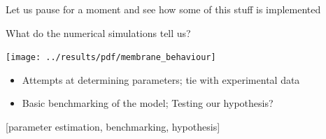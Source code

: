 \documentclass[ignorenonframetext]{beamer}
\newcommand{\references}[1] {
  \begin{flushright}
    \scriptsize [#1] \normalsize
  \end{flushright}
}
\begin{document}
\begin{frame}{Let us pause for a moment and see how some of this stuff is implemented}




\end{frame}

%

\begin{frame}{What do the numerical simulations tell us?}

  \texttt{[image: ../results/pdf/membrane\_behaviour]}

  \begin{itemize}
  \item Attempts at determining parameters; tie with experimental data
  \item Basic benchmarking of the model; Testing our hypothesis?
  \end{itemize}

  \references{parameter estimation, benchmarking, hypothesis}

\end{frame}

\end{document}
